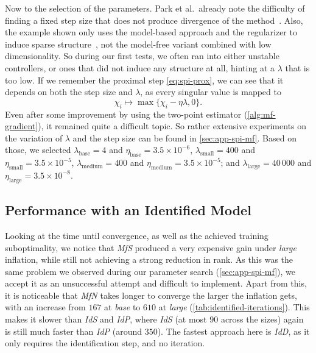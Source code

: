 Now to the selection of the parameters. Park et al.\ already note the difficulty of finding a fixed step size
that does not produce divergence of the method~\cite[Sec.~3.2]{Park2020Structured}. Also, the example shown only
uses the model-based approach and the regularizer to induce sparse structure~\cite[Sec.~4]{Park2020Structured}, not the model-free variant combined
with low dimensionality. So during our first tests, we often ran into either unstable controllers, or ones that
did not induce any structure at all, hinting at a $\lambda$ that is too low. If we remember the proximal step
\eqref{eq:spi-prox}, we can see that it depends on both the step size and $\lambda$, as every singular value is
mapped to
\begin{equation}
    \label{eq:spi-threshold}
    \chi_i \mapsto \max\{ \chi_i - \eta \lambda, 0 \} .
\end{equation}
Even after some improvement by using the two-point estimator (\cref{alg:mf-gradient}), it remained quite a difficult
topic. So rather extensive experiments on the variation of $\lambda$ and the step size can be found in \cref{sec:app-spi-mf}.
Based on those, we selected $\lambda_{\mathrm{base}} = 4$ and $\eta_{\mathrm{base}} = 3.5 \times 10^{-6}$, $\lambda_{\mathrm{small}} = 400$ and $\eta_{\mathrm{small}} = 3.5 \times 10^{-5}$,
$\lambda_{\mathrm{medium}} = 400$ and $\eta_{\mathrm{medium}} = 3.5 \times 10^{-5}$; and $\lambda_{\mathrm{large}} = 40\,000$ and $\eta_{\mathrm{large}} = 3.5 \times 10^{-8}$.

\subsection{Performance with an Identified Model}
\label{subsec:unknown-model-results}

Looking at the time until convergence, as well as the achieved training suboptimality, we notice that \emph{MfS}
produced a very expensive gain under \emph{large} inflation, while still not achieving a strong reduction in rank. As this was the same problem
we observed during our parameter search (\cref{sec:app-spi-mf}), we accept it as an unsuccessful attempt and difficult to implement. Apart from
this, it is noticeable that \emph{MfN} takes longer to converge the larger the inflation gets, with an increase from $167$ at \emph{base} to $610$ at \emph{large} (\cref{tab:identified-iterations}).
This makes it slower than \emph{IdS} and \emph{IdP}, where \emph{IdS} (at most $90$ across the sizes) again is still much faster than \emph{IdP} (around $350$). The fastest approach here is \emph{IdD}, as it only
requires the identification step, and no iteration.

